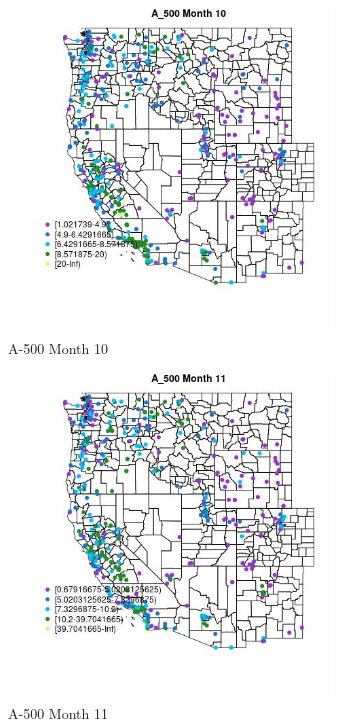 \begin{figure} 
\centering  
\includegraphics[width=0.77\textwidth]{Code_Outputs/ML_input_report_ML_input_PM25_Step5_part_d_de_duplicated_aves_ML_input_MapObsMo10A_500.jpg} 
\caption{\label{fig:ML_input_report_ML_input_PM25_Step5_part_d_de_duplicated_aves_ML_inputMapObsMo10A_500}A-500 Month 10} 
\end{figure} 
 

\begin{figure} 
\centering  
\includegraphics[width=0.77\textwidth]{Code_Outputs/ML_input_report_ML_input_PM25_Step5_part_d_de_duplicated_aves_ML_input_MapObsMo11A_500.jpg} 
\caption{\label{fig:ML_input_report_ML_input_PM25_Step5_part_d_de_duplicated_aves_ML_inputMapObsMo11A_500}A-500 Month 11} 
\end{figure} 
 

